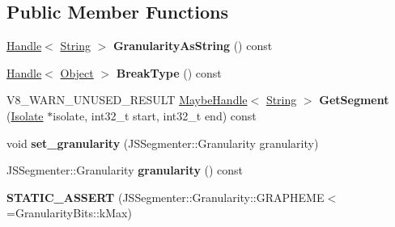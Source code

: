 \subsection*{Public Member Functions}
\begin{DoxyCompactItemize}
\item 
\mbox{\label{classv8_1_1internal_1_1JSSegmentIterator_a16124e98a0bcfedc8acb20e691ca7179}} 
\mbox{\hyperlink{classv8_1_1internal_1_1Handle}{Handle}}$<$ \mbox{\hyperlink{classv8_1_1internal_1_1String}{String}} $>$ {\bfseries Granularity\+As\+String} () const
\item 
\mbox{\label{classv8_1_1internal_1_1JSSegmentIterator_a9819799156edd62647bb93d0eb495857}} 
\mbox{\hyperlink{classv8_1_1internal_1_1Handle}{Handle}}$<$ \mbox{\hyperlink{classv8_1_1internal_1_1Object}{Object}} $>$ {\bfseries Break\+Type} () const
\item 
\mbox{\label{classv8_1_1internal_1_1JSSegmentIterator_a1f275a5fcfcc472de7c76d2849f8132b}} 
V8\+\_\+\+W\+A\+R\+N\+\_\+\+U\+N\+U\+S\+E\+D\+\_\+\+R\+E\+S\+U\+LT \mbox{\hyperlink{classv8_1_1internal_1_1MaybeHandle}{Maybe\+Handle}}$<$ \mbox{\hyperlink{classv8_1_1internal_1_1String}{String}} $>$ {\bfseries Get\+Segment} (\mbox{\hyperlink{classv8_1_1internal_1_1Isolate}{Isolate}} $\ast$isolate, int32\+\_\+t start, int32\+\_\+t end) const
\item 
\mbox{\label{classv8_1_1internal_1_1JSSegmentIterator_a790f2c1777d7101733ea887a879474e5}} 
void {\bfseries set\+\_\+granularity} (J\+S\+Segmenter\+::\+Granularity granularity)
\item 
\mbox{\label{classv8_1_1internal_1_1JSSegmentIterator_a7295183d10fa655073e97f7d776688bf}} 
J\+S\+Segmenter\+::\+Granularity {\bfseries granularity} () const
\item 
\mbox{\label{classv8_1_1internal_1_1JSSegmentIterator_abdbb9e64e52dae5b645de6b86e458cfa}} 
{\bfseries S\+T\+A\+T\+I\+C\+\_\+\+A\+S\+S\+E\+RT} (J\+S\+Segmenter\+::\+Granularity\+::\+G\+R\+A\+P\+H\+E\+ME$<$=Granularity\+Bits\+::k\+Max)
\item 

\end{DoxyCompactItemize}
